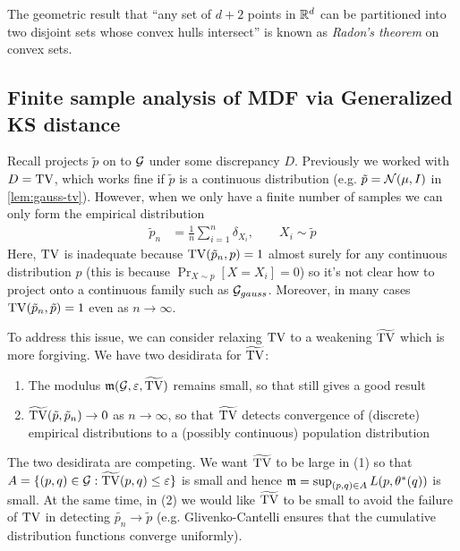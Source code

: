 \begin{remark}
    The geometric result that ``any set of $d+2$ points in $\mathbb{R}^d$ can be
    partitioned into two disjoint sets whose convex hulls intersect'' is known
    as \emph{Radon's theorem} on convex sets.
\end{remark}

\subsection{Finite sample analysis of MDF via Generalized KS distance}

Recall  projects $\tilde{p}$ on to $\mathcal{G}$ under some discrepancy
$D$.  Previously we worked with $D = \operatorname{TV}$, which works fine if $\tilde{p}$ is a
continuous distribution (e.g. $\tilde{p} = \mathcal{N}(\mu, I)$ in \cref{lem:gauss-tv}).
However, when we only have a finite number of samples we can only form the
empirical distribution
\begin{align}
    \tilde{p}_n
    &= \frac{1}{n} \sum_{i=1}^n \delta_{X_i},
    \qquad X_i \sim \tilde{p}
\end{align}
Here, $\operatorname{TV}$ is inadequate because $\operatorname{TV}(\tilde{p}_n, p) = 1$ almost surely
for any continuous distribution $p$ (this is because $\Pr_{X \sim p}[X = X_i] = 0$)
so it's not clear how to project onto a continuous family such as $\mathcal{G}_{gauss}$.
Moreover, in many cases $\operatorname{TV}(\tilde{p}_n, \tilde{p}) = 1$ even as $n \to \infty$.

To address this issue, we can consider relaxing $\operatorname{TV}$ to
a weakening $\widetilde{\operatorname{TV}}$ which is more forgiving.
We have two desidirata for $\widetilde{\operatorname{TV}}$:
\begin{enumerate}
    \item The modulus $\mathfrak{m}(\mathcal{G}, \varepsilon, \widetilde{\operatorname{TV}})$ remains small, so that
         still gives a good result
    \item $\widetilde{\operatorname{TV}}(\tilde{p}, \tilde{p}_n) \to 0$ as $n \to \infty$,
        so that $\widetilde{\operatorname{TV}}$ detects convergence of (discrete) empirical
        distributions to a (possibly continuous) population distribution
\end{enumerate}

\begin{remark}
    The two desidirata are competing.
    We want $\widetilde{\operatorname{TV}}$ to be large in
    (1) so that $A = \{ (p,q) \in \mathcal{G} : \widetilde{\operatorname{TV}}(p,q) \leq \varepsilon \}$ is
    small and hence $\mathfrak{m} = \sup_{(p,q) \in A} L(p, \theta^*(q))$ is small.
    At the same time, in (2) we would like $\widetilde{\operatorname{TV}}$ to be small
    to avoid the failure of $\operatorname{TV}$ in detecting $\tilde{p_n} \to \tilde{p}$
    (e.g. Glivenko-Cantelli ensures that the cumulative distribution functions
    converge uniformly).
\end{remark}

